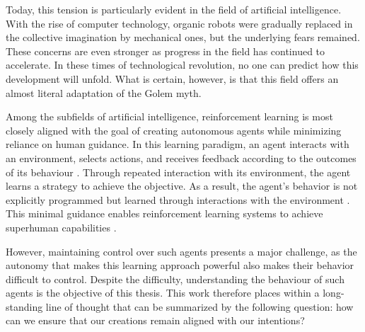Today, this tension is particularly evident in the field of artificial intelligence.
With the rise of computer technology, organic robots were gradually replaced in the collective imagination by mechanical ones, but the underlying fears remained.
These concerns are even stronger as progress in the field has continued to accelerate.
In these times of technological revolution, no one can predict how this development will unfold.
What is certain, however, is that this field offers an almost literal adaptation of the Golem myth.

Among the subfields of artificial intelligence, reinforcement learning is most closely aligned with the goal of creating autonomous agents while minimizing reliance on human guidance.
In this learning paradigm, an agent interacts with an environment, selects actions, and receives feedback according to the outcomes of its behaviour \parencite{sutton2018reinforcement}.
Through repeated interaction with its environment, the agent learns a strategy to achieve the objective.
As a result, the agent's behavior is not explicitly programmed but learned through interactions with the environment \parencite{amodei2016concrete}.
This minimal guidance enables reinforcement learning systems to achieve superhuman capabilities \parencite{silver2017mastering, openai2019dota2largescale}.

However, maintaining control over such agents presents a major challenge, as the autonomy that makes this learning approach powerful also makes their behavior difficult to control.
Despite the difficulty, understanding the behaviour of such agents is the objective of this thesis.
This work therefore places within a long-standing line of thought that can be summarized by the following question: how can we ensure that our creations remain aligned with our intentions?
